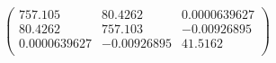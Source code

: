 \documentclass{article}
\begin{document}
\[\left(
\begin{array}{ccc}
 757.105 & 80.4262 & 0.0000639627 \\
 80.4262 & 757.103 & -0.00926895 \\
 0.0000639627 & -0.00926895 & 41.5162 \\
\end{array}
\right)\]
\end{document}
